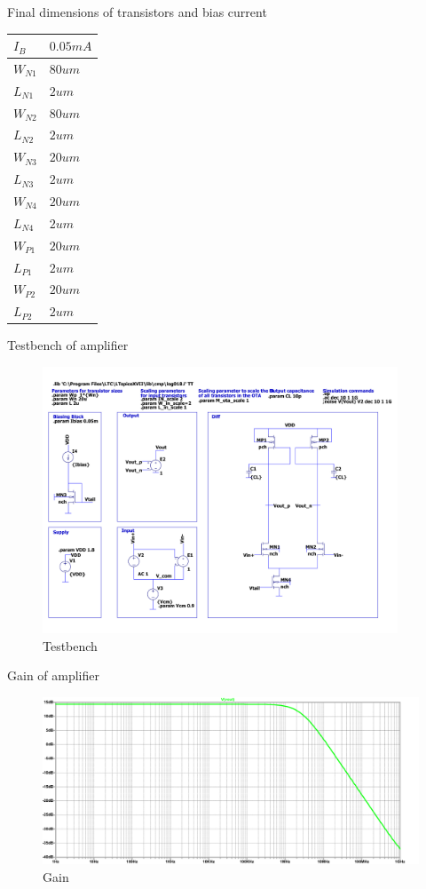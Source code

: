 \documentclass{article}
\begin{document}
Final dimensions of transistors and bias current
\begin{center}
\begin{tabular}{ll}
\hline
\(I_{B}\) & \(0.05mA\)\\
\hline
\(W_{N1}\) & \(80um\)\\
\(L_{N1}\) & \(2um\)\\
\(W_{N2}\) & \(80um\)\\
\(L_{N2}\) & \(2um\)\\
\hline
\(W_{N3}\) & \(20um\)\\
\(L_{N3}\) & \(2um\)\\
\(W_{N4}\) & \(20um\)\\
\(L_{N4}\) & \(2um\)\\
\hline
\(W_{P1}\) & \(20um\)\\
\(L_{P1}\) & \(2um\)\\
\(W_{P2}\) & \(20um\)\\
\(L_{P2}\) & \(2um\)\\
\hline
\end{tabular}
\end{center}

Testbench of amplifier
\begin{figure}[H]
\centering
\includegraphics[height=300px]{img/q4/testbench.pdf}
\caption{\label{fig:testbench-q4}Testbench}
\end{figure}

Gain of amplifier
\begin{figure}[H]
\centering
\includegraphics[width=.9\linewidth]{img/q4/gain.pdf}
\caption{\label{fig:gain-q4}Gain}
\end{figure}
\end{document}
